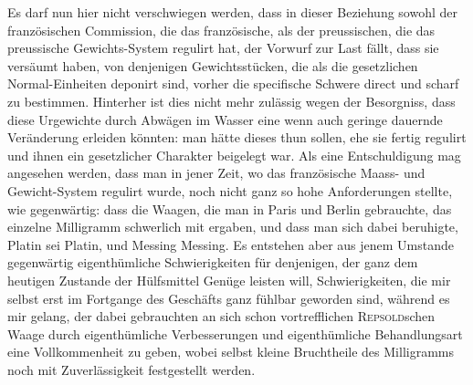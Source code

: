\clearpage{}
Es darf nun hier nicht verschwiegen werden, dass in dieser Beziehung
sowohl der französischen Commission, die das französische, als der preussischen,
die das preussische Gewichts-System regulirt hat, der Vorwurf zur Last fällt,
dass sie versäumt haben, von denjenigen Gewichtsstücken, die als die gesetzlichen
Normal-Einheiten deponirt sind, vorher die specifische Schwere direct
und scharf zu bestimmen. Hinterher ist dies nicht mehr zulässig wegen der
Besorgniss, dass diese Urgewichte durch Abwägen im Wasser eine wenn auch
geringe dauernde Veränderung erleiden könnten: man hätte dieses 
thun sollen, ehe sie fertig regulirt und ihnen ein gesetzlicher Charakter beigelegt
war. Als eine Entschuldigung mag angesehen werden, dass man in
jener Zeit, wo das französische Maass- und Gewicht-System regulirt wurde,
noch nicht ganz so hohe Anforderungen stellte, wie gegenwärtig: dass die
Waagen, die man in Paris und Berlin gebrauchte, das einzelne Milligramm
schwerlich mit  ergaben, und dass man sich dabei beruhigte,
Platin sei Platin, und Messing Messing. Es entstehen aber aus jenem Umstande
gegenwärtig eigenthümliche Schwierigkeiten für denjenigen, der ganz
dem heutigen Zustande der Hülfsmittel Genüge leisten will, Schwierigkeiten,
die mir selbst erst im Fortgange des Geschäfts ganz fühlbar geworden sind,
während es mir gelang, der dabei gebrauchten an sich schon vortrefflichen
\textsc{Repsold}schen Waage durch eigenthümliche Verbesserungen und eigenthümliche
Behandlungsart eine Vollkommenheit zu geben, wobei selbst kleine
Bruchtheile des Milligramms noch mit Zuverlässigkeit festgestellt werden.

